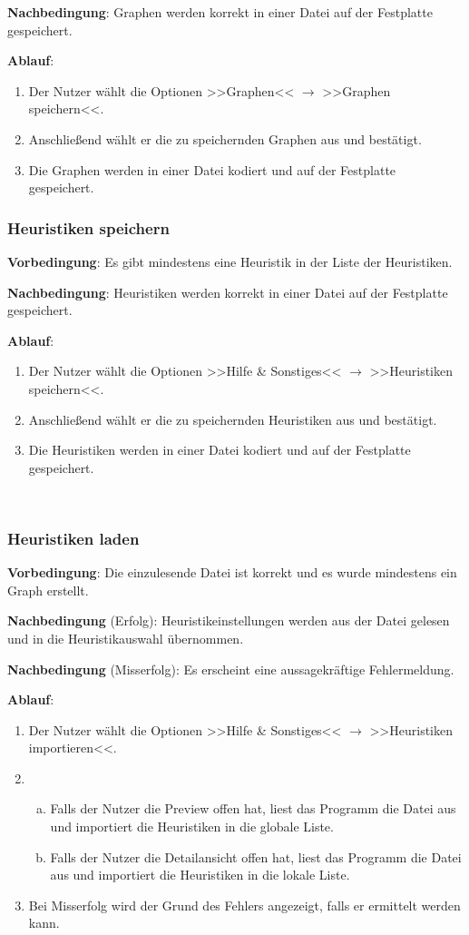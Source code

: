 \documentclass{article}
\begin{document}
	\textbf{Nachbedingung}: Graphen werden korrekt in einer Datei auf der Festplatte gespeichert.
	
	\textbf{Ablauf}:
	\begin{enumerate}[1)]
		\item{Der Nutzer wählt die Optionen >>Graphen<< $\rightarrow$ >>Graphen speichern<<.}
		\item{Anschließend wählt er die zu speichernden Graphen aus und bestätigt.}
		\item{Die Graphen werden in einer Datei kodiert und auf der Festplatte gespeichert.}
	\end{enumerate}
	
	
	\subsubsection{Heuristiken speichern}
	\textbf{Vorbedingung}: Es gibt mindestens eine Heuristik in der Liste der Heuristiken.
	
	\textbf{Nachbedingung}: Heuristiken werden korrekt in einer Datei auf der Festplatte gespeichert.
	
	\textbf{Ablauf}:
	\begin{enumerate}[1)]
		\item{Der Nutzer wählt die Optionen >>Hilfe \& Sonstiges<< $\rightarrow$ >>Heuristiken speichern<<.}
		\item{Anschließend wählt er die zu speichernden Heuristiken aus und bestätigt.}
		\item{Die Heuristiken werden in einer Datei kodiert und auf der Festplatte gespeichert.}
	\end{enumerate}
	
	
	~\newpage
	\subsubsection{Heuristiken laden}
	\textbf{Vorbedingung}: Die einzulesende Datei ist korrekt und es wurde mindestens ein Graph erstellt.
	
	\textbf{Nachbedingung} (Erfolg): Heuristikeinstellungen werden aus der Datei gelesen und in die Heuristikauswahl übernommen.
	
	\textbf{Nachbedingung} (Misserfolg): Es erscheint eine aussagekräftige Fehlermeldung.
	
	\textbf{Ablauf}:
	\begin{enumerate}[1)]
		\item{Der Nutzer wählt die Optionen >>Hilfe \& Sonstiges<< $\rightarrow$ >>Heuristiken importieren<<.}
		\item{
			\begin{enumerate}[a)]
				\item{Falls der Nutzer die Preview offen hat, liest das Programm die Datei aus und importiert die Heuristiken in die globale Liste.}
				\item{Falls der Nutzer die Detailansicht offen hat, liest das Programm die Datei aus und importiert die Heuristiken in die lokale Liste.}
			\end{enumerate}
		}
		\item{Bei Misserfolg wird der Grund des Fehlers angezeigt, falls er ermittelt werden kann.}
	\end{enumerate}
\end{document}
